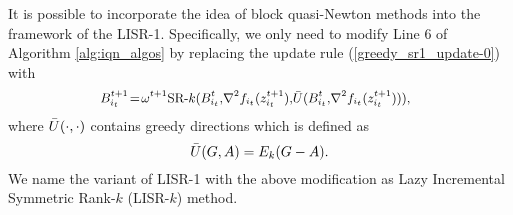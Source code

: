 \documentclass[letterpaper]{article} %
\theoremstyle{plain}
\theoremstyle{definition}
\theoremstyle{remark}
\begin{document}
It is possible to incorporate the idea of block quasi-Newton methods into the framework of the LISR-1.
Specifically, we only need to modify Line 6 of Algorithm \ref{alg:iqn_algos} by replacing the update rule (\ref{greedy_sr1_update-0}) with 
\begin{equation}\label{greedy_srk_update}
\small
\begin{split}    
\!\!\!\!B_{i_t}^{t+1}\!=\!\omega^{t+1} \textrm{SR-}k(B_{i_t}^{t},\!\nabla^2 f_{i_t}(z_{i_t}^{t+1}),\!\Bar{U}(B_{i_t}^{t},\!\nabla^2 f_{i_t}(z_{i_t}^{t+1}))),
\end{split}
\end{equation}
where $\Bar U(\cdot,\cdot)$ contains greedy directions which is defined as
\begin{equation}
    \Bar{U}(G, A)
    = E_k(G-A).
    \label{greedy_matrix}
\end{equation}
We name the variant of LISR-1 with the above modification as Lazy Incremental Symmetric Rank-$k$ (LISR-$k$) method.
\end{document}
